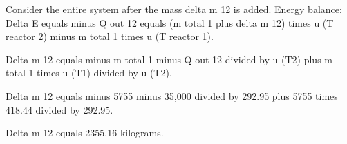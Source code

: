 Consider the entire system after the mass delta m 12 is added. Energy balance:  
Delta E equals minus Q out 12 equals (m total 1 plus delta m 12) times u (T reactor 2) minus m total 1 times u (T reactor 1).  

Delta m 12 equals minus m total 1 minus Q out 12 divided by u (T2) plus m total 1 times u (T1) divided by u (T2).  

Delta m 12 equals minus 5755 minus 35,000 divided by 292.95 plus 5755 times 418.44 divided by 292.95.  

Delta m 12 equals 2355.16 kilograms.